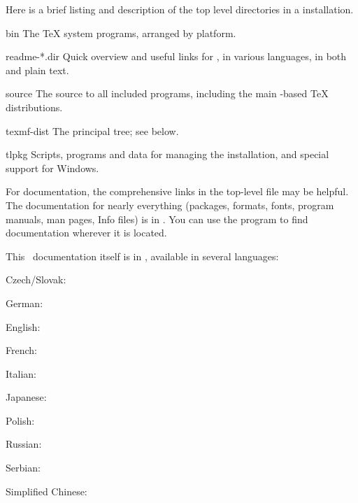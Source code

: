 \documentclass{article}
\begin{document}
Here is a brief listing and description of the top level directories in a
\TL{} installation.  

\begin{ttdescription}
\item[bin] The \TeX{} system programs, arranged by platform.
%
\item[readme-*.dir] Quick overview and useful links for \TL{},
in various languages, in both \HTML{} and plain text.
%
\item[source] The source to all included programs, including the main
  \Webc{}-based \TeX{} distributions.
%
\item[texmf-dist] The principal tree; see  below.
%
\item[tlpkg] Scripts, programs and data for managing the
  installation, and special support for Windows.
\end{ttdescription}

For documentation, the comprehensive links in the top-level file
 may be helpful.  The documentation for nearly everything
(packages, formats, fonts, program manuals, man pages, Info files) is in
.  You can use the  program to
find documentation wherever it is located.

This \TL\ documentation itself is in ,
available in several languages:

\begin{itemize*}
\item{Czech/Slovak:} 
\item{German:} 
\item{English:} 
\item{French:} 
\item{Italian:} 
\item{Japanese:} 
\item{Polish:} 
\item{Russian:} 
\item{Serbian:} 
\item{Simplified Chinese:} 
\end{itemize*}
\end{document}
